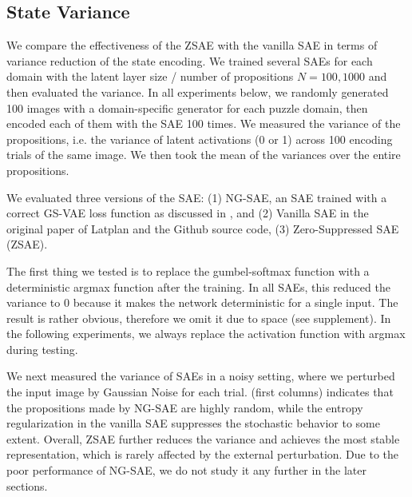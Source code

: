 \subsection{State Variance}

We compare the effectiveness of the ZSAE with the vanilla SAE in terms of variance reduction of the state encoding.
We trained several SAEs for each domain with the latent layer size / number of propositions $N=100,1000$
and then evaluated the variance.
In all experiments below,
we randomly generated 100 images with a domain-specific generator for each puzzle domain,
then encoded each of them with the SAE 100 times.
We measured the variance of the propositions, i.e. the variance of latent activations (0 or 1)
across 100 encoding trials of the same image.
We then took the mean of the variances over the entire propositions.

We evaluated three versions of the SAE:
(1) NG-SAE, an SAE trained with a correct GS-VAE loss function as discussed in , and
(2) Vanilla SAE in the original paper of Latplan \cite{Asai2018} and the Github source code,
(3) Zero-Suppressed SAE (ZSAE).

The first thing we tested is to replace the gumbel-softmax function with a deterministic argmax function
after the training.
In all SAEs,
this reduced the variance to 0 because it makes the network deterministic for a single input.
The result is rather obvious, therefore we omit it due to space (see supplement).
In the following experiments, we always replace the activation function with argmax during testing.

We next measured the variance of SAEs in a noisy setting, where
we perturbed the input image by Gaussian Noise for each trial.
 (first columns) indicates that
the propositions made by NG-SAE are highly random,
while the entropy regularization in the vanilla SAE suppresses the stochastic behavior to some extent.
Overall, ZSAE further reduces the variance and achieves the most stable representation,
which is rarely affected by the external perturbation.
% 
Due to the poor performance of NG-SAE, we do not study it any further in the later sections.

